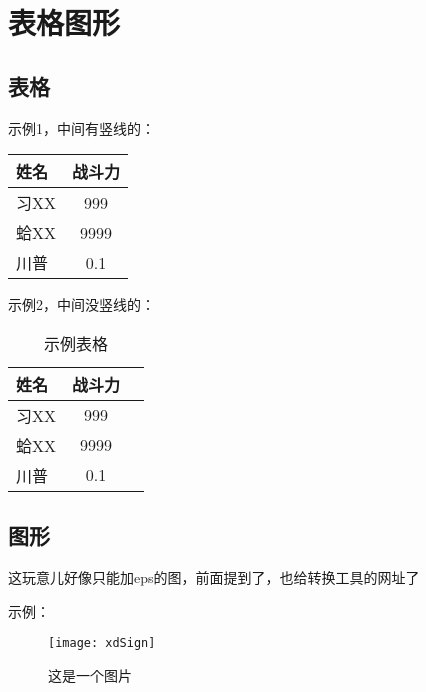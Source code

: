 
\chapter{表格图形}
\label{chap:tabfig}

\section{表格}
示例1，中间有竖线的：
\begin{center}
\begin{tabular}[t]{l|c}
    \hline
    姓名 & 战斗力 \\
    \hline
    习XX & 999 \\
    蛤XX & 9999 \\
    川普 & 0.1 \\
    \hline
\end{tabular}
\end{center}


示例2，中间没竖线的：
\begin{table}[htbp]
 \caption{\label{tab:test}示例表格}
 \centering
 \begin{tabular}{lcl}
  \toprule
    姓名 & 战斗力 \\
  \midrule
    习XX & 999 \\
    蛤XX & 9999 \\
    川普 & 0.1 \\
  \bottomrule
 \end{tabular}
\end{table}

\section{图形}
这玩意儿好像只能加eps的图，前面提到了，也给转换工具的网址了

示例：
\begin{figure}[h]
 \centering
 \texttt{[image: xdSign]}
 \caption{这是一个图片}
 \label{fig:amss1}
\end{figure}



